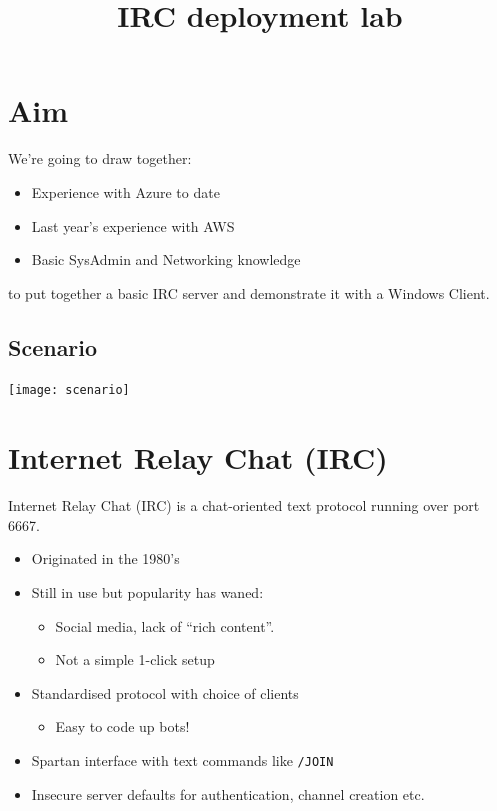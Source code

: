 \documentclass[slides]{pgnotes}
\title{IRC deployment lab}
\begin{document}
\maketitle

\tableofcontents

\section{Aim}

We're going to draw together:

\begin{itemize}
\item Experience with Azure to date
\item Last year's experience with AWS
\item Basic SysAdmin and Networking knowledge
\end{itemize}

to put together a basic IRC server and demonstrate it with a Windows Client.

\subsection{Scenario}

\begin{center}
\texttt{[image: scenario]}
\end{center}


\section{Internet Relay Chat (IRC)}

Internet Relay Chat (IRC) is a chat-oriented text protocol running over port 6667.

\begin{itemize}
\item Originated in the 1980's
\item Still in use but popularity has waned:
  \begin{itemize}
  \item Social media, lack of ``rich content''.
  \item Not a simple 1-click setup
  \end{itemize}
\item Standardised protocol with choice of clients
  \begin{itemize}
  \item Easy to code up bots!
  \end{itemize}
\item Spartan interface with text commands like \texttt{/JOIN}
\item Insecure server defaults for authentication, channel creation etc.
\end{itemize}
\end{document}
